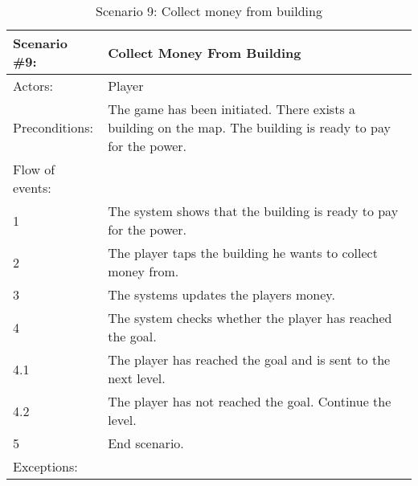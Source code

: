 \begin{table}
	\begin{tabular}{| l | p{10cm} |}
		\hline
		\rowcolor{lightgray}
		{\bf Scenario \#9:} & {\bf Collect Money From Building} \\ \hline
		Actors: & Player \\ \hline
		Preconditions: & The game has been initiated. There exists a building on the map. The building is ready to pay for the power. \\ \hline
		\rowcolor{lightergray}
		Flow of events: & \\ \hline
		1 & The system shows that the building is ready to pay for the power. \\ \hline
		2 & The player taps the building he wants to collect money from. \\ \hline
		3 & The systems updates the players money. \\ \hline
		4 & The system checks whether the player has reached the goal. \\ \hline
		4.1 & The player has reached the goal and is sent to the next level. \\ \hline
		4.2 & The player has not reached the goal. Continue the level. \\ \hline
		5 & End scenario. \\ \hline
		\rowcolor{lightergray}
		Exceptions: & \\ \hline
	\end{tabular}
\caption{Scenario 9: Collect money from building}
\end{table}
